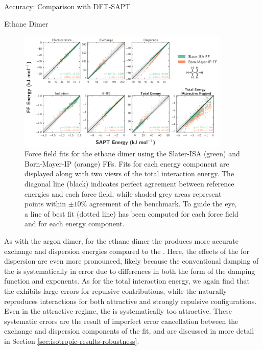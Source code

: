 \begin{subsection}{Accuracy: Comparison with DFT-SAPT}
\begin{subsubsection}{Ethane Dimer}
    \begin{figure}
    \includegraphics[width=0.9\textwidth]{isotropic/ethane_ethane_scatter.pdf}
    \caption{
    Force field fits for the ethane dimer using the Slater-ISA (green) and
    Born-Mayer-IP (orange) FFs.
    Fits for each energy component are displayed along with two views of the total interaction energy.
    The diagonal line (black) indicates perfect agreement between reference energies
    and each force field, while shaded grey areas represent points within $\pm
    10\%$ agreement of the benchmark. To guide the eye, a line of best fit (dotted
    line) has been computed for each force field and for each energy component.
     }
    \label{fig:isotropic-ethane-scatter}
    \end{figure}

As with the argon dimer, for the ethane dimer the \isaffold produces more
accurate exchange and dispersion energies compared to the \saptff. Here, the
effects of the \isaffold for dispersion are even more pronounced, likely because
the conventional damping of the \saptff is systematically in error due to
differences in both the form of the damping function and exponents. As for the
total interaction energy, we again find that the \saptff exhibits large errors
for repulsive contributions, while the \isaffold naturally reproduces
interactions for both attractive and strongly repulsive configurations.  Even
in the attractive regime, the \saptff is systematically too attractive. These
systematic errors are the result of imperfect error cancellation
between the exchange and dispersion components of the fit, and are discussed in
more detail in Section \ref{sec:isotropic-results-robustness}. 


\end{subsubsection}
\end{subsection}
